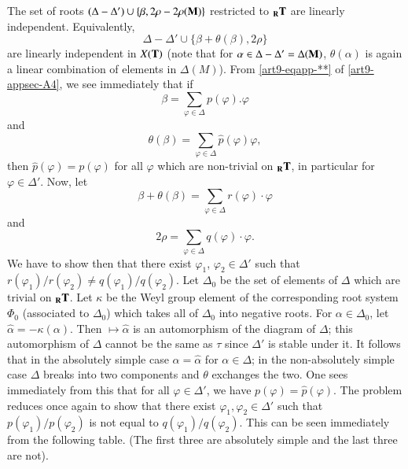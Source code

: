 The set of roots $(\Delta - \Delta' ) \cup \{\beta, 2 \rho - 2 \rho (\mathbf{M})\}$ restricted to ${}_{\mathbf{R}} \mathbf{T}$ are linearly independent. Equivalently,
$$
\Delta - \Delta' \cup \{\beta + \theta (\beta), 2\rho\}
$$
are linearly independent in $X(\mathbf{T})$ (note that for $\alpha \in \Delta - \Delta' = \Delta (\mathbf{M})$, $\theta(\alpha)$ is again a linear combination of elements in $\Delta (M)$). From \ref{art9-eqapp-**} of \ref{art9-appsec-A4}, we see immediately that if 
$$
\beta = \sum\limits_{\varphi \in \Delta} p (\varphi) . \varphi
$$\pageoriginale 
and 
$$
\theta (\beta) = \sum\limits_{\varphi \in \Delta} \hat{p} (\varphi) \varphi,
$$
then $\hat{p}(\varphi) = p (\varphi)$ for all $\varphi$ which are non-trivial on ${}_{\mathbf{R}}\mathbf{T}$, in particular for $\varphi \in \Delta'$. Now, let
$$
\beta + \theta (\beta) = \sum\limits_{\varphi \in \Delta} r (\varphi)\cdot \varphi
$$
and 
$$
2 \rho = \sum\limits_{\varphi \in \Delta} q (\varphi) \cdot \varphi.
$$
We have to show then that there exist $\varphi_1$, $\varphi_2 \in \Delta'$ such that $r(\varphi_1)/ r (\varphi_2) \neq q (\varphi_1)/ q(\varphi_2)$. Let $\Delta_0$ be the set of elements of $\Delta$ which are trivial on ${}_{\mathbf{R}}\mathbf{T}$. Let $\kappa$ be the Weyl group element of the corresponding root system $\Phi_0$ (associated to $\Delta_0$) which takes all of $\Delta_0$ into negative roots. For $\alpha \in \Delta_0$, let $\hat{\alpha} = -\kappa (\alpha)$. Then $\longmapsto \hat{\alpha}$ is an automorphism of the diagram of $\Delta$; this automorphism of $\Delta$ cannot be the same as $\tau$  since $\Delta'$ is stable under it. It follows that in the absolutely simple case $\alpha = \hat{\alpha}$ for $\alpha \in \Delta$; in the non-absolutely simple case $\Delta$ breaks into two components and $\theta$ exchanges the two. One sees immediately from this that for all $\varphi \in \Delta'$, we have $p(\varphi) = \hat{p}(\varphi)$. The problem reduces once again to show that there exist $\varphi_1, \varphi_2 \in \Delta'$ such that $p(\varphi_1) / p (\varphi_2)$ is not equal to $q(\varphi_1)/q(\varphi_2)$. This can be seen immediately from the following table. (The first three are absolutely simple and the last three are not).

